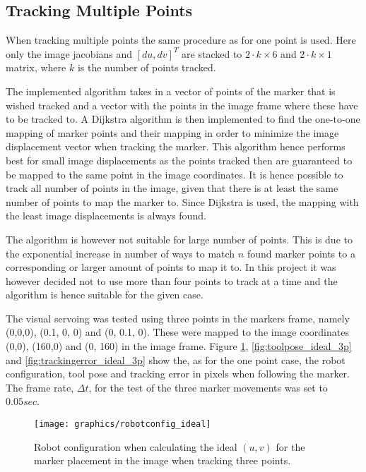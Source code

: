 \subsection{Tracking Multiple Points}

When tracking multiple points the same procedure as for one point is used.
Here only the image jacobians and $[du, dv]^T$ are stacked to $2 \cdot k \times 6$ and $2 \cdot k \times 1$ matrix, where $k$ is the number of points tracked.

The implemented algorithm takes in a vector of points of the marker that is wished tracked and a vector with the points in the image frame where these have to be tracked to.
A Dijkstra algorithm is then implemented to find the one-to-one mapping of marker points and their mapping in order to minimize the image displacement vector when tracking the marker.
This algorithm hence performs best for small image displacements as the points tracked then are guaranteed to be mapped to the same point in the image coordinates.
It is hence possible to track all number of points in the image, given that there is at least the same number of points to map the marker to.
Since Dijkstra is used, the mapping with the least image displacements is always found.

The algorithm is however not suitable for large number of points.
This is due to the exponential increase in number of ways to match $n$ found marker points to a corresponding or larger amount of points to map it to.
In this project it was however decided not to use more than four points to track at a time and the algorithm is hence suitable for the given case.


The visual servoing was tested using three points in the markers frame, namely (0,0,0), (0.1, 0, 0) and (0, 0.1, 0).
These were mapped to the image coordinates (0,0), (160,0) and (0, 160) in the image frame.
Figure \ref{fig:robotconfig_ideal_3p}, \ref{fig:toolpose_ideal_3p} and \ref{fig:trackingerror_ideal_3p} show the, as for the one point case, the robot configuration, tool pose and tracking error in pixels when following the marker.
The frame rate, $\Delta t$, for the test of the three marker movements was set to $0.05 sec$.


\begin{figure}[H]
\centering
\texttt{[image: graphics/robotconfig\_ideal]}
\caption{Robot configuration when calculating the ideal $(u,v)$ for the marker placement in the image when tracking three points.}
\label{fig:robotconfig_ideal_3p}
\end{figure}


